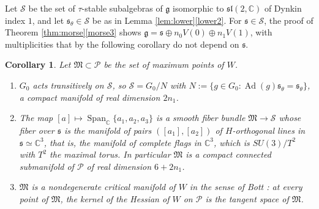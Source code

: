 \documentclass [leqno, 10pt]{amsart}
\newtheorem{corollary}[theorem]{Corollary}%
\theoremstyle{definition}
\numberwithin{equation}{section}
\newcommand{\spn}{\operatorname{Span}}
\newcommand{\sll}{\mathfrak{sl}}
\newcommand{\g}{\mathfrak{g}}
\newcommand{\Ad}{\operatorname{Ad}}
\newcommand{\com}{\mathbb C}
\newcommand{\subs}{\mathfrak{s}}
\begin{document}
Let $\mathcal{S}$ be the set of $\tau$-stable subalgebras of $\g$ isomorphic to $\sll(2, \com)$ of Dynkin index $1$, and let $\subs_{\theta} \in \mathcal{S}$ be as in Lemma \ref{lem:lower}\ref{lower2}. For $\subs \in \mathcal{S}$, the proof of Theorem \ref{thm:morse}\ref{morse3} shows $\g = \subs \oplus n_{0}V(0) \oplus n_{1}V(1)$, with multiplicities that by the following corollary do not depend on $\subs$.
\begin{corollary}\label{cor:morsebott}
Let $\mathfrak{M} \subset \mathcal{P}$ be the set of maximum points of $W$.
\begin{enumerate}[label=(\arabic*), ref=(\arabic*)]
\item\label{mb1} $G_{0}$ acts transitively on $\mathcal{S}$, so $\mathcal{S} = G_{0}/N$ with $N := \{g \in G_{0}: \Ad(g)\subs_{\theta} = \subs_{\theta}\}$, a compact manifold of real dimension $2n_{1}$.
\item\label{mb2} The map $[a] \mapsto \spn_{\com}\{a_{1}, a_{2}, a_{3}\}$ is a smooth fiber bundle $\mathfrak{M} \to \mathcal{S}$ whose fiber over $\subs$ is the manifold of pairs $([a_{1}], [a_{2}])$ of $H$-orthogonal lines in $\subs \simeq \com^{3}$, that is, the manifold of complete flags in $\com^{3}$, which is $SU(3)/T^{2}$ with $T^{2}$ the maximal torus. In particular $\mathfrak{M}$ is a compact connected submanifold of $\mathcal{P}$ of real dimension $6 + 2n_{1}$.
\item\label{mb3} $\mathfrak{M}$ is a nondegenerate critical manifold of $W$ in the sense of Bott \cite{Bott-nondegenerate}: at every point of $\mathfrak{M}$, the kernel of the Hessian of $W$ on $\mathcal{P}$ is the tangent space of $\mathfrak{M}$.
\end{enumerate}
\end{corollary}
\end{document}

